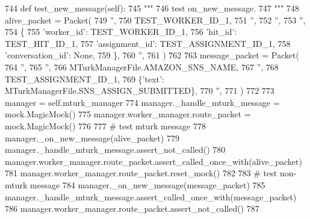 \begin{DoxyCode}
744     \textcolor{keyword}{def }test\_new\_message(self):
745         \textcolor{stringliteral}{"""}
746 \textcolor{stringliteral}{        test on\_new\_message.}
747 \textcolor{stringliteral}{        """}
748         alive\_packet = Packet(
749             \textcolor{stringliteral}{''},
750             TEST\_WORKER\_ID\_1,
751             \textcolor{stringliteral}{''},
752             \textcolor{stringliteral}{''},
753             \textcolor{stringliteral}{''},
754             \{
755                 \textcolor{stringliteral}{'worker\_id'}: TEST\_WORKER\_ID\_1,
756                 \textcolor{stringliteral}{'hit\_id'}: TEST\_HIT\_ID\_1,
757                 \textcolor{stringliteral}{'assignment\_id'}: TEST\_ASSIGNMENT\_ID\_1,
758                 \textcolor{stringliteral}{'conversation\_id'}: \textcolor{keywordtype}{None},
759             \},
760             \textcolor{stringliteral}{''},
761         )
762 
763         message\_packet = Packet(
764             \textcolor{stringliteral}{''},
765             \textcolor{stringliteral}{''},
766             MTurkManagerFile.AMAZON\_SNS\_NAME,
767             \textcolor{stringliteral}{''},
768             TEST\_ASSIGNMENT\_ID\_1,
769             \{\textcolor{stringliteral}{'text'}: MTurkManagerFile.SNS\_ASSIGN\_SUBMITTED\},
770             \textcolor{stringliteral}{''},
771         )
772 
773         manager = self.mturk\_manager
774         manager.\_handle\_mturk\_message = mock.MagicMock()
775         manager.worker\_manager.route\_packet = mock.MagicMock()
776 
777         \textcolor{comment}{# test mturk message}
778         manager.\_on\_new\_message(alive\_packet)
779         manager.\_handle\_mturk\_message.assert\_not\_called()
780         manager.worker\_manager.route\_packet.assert\_called\_once\_with(alive\_packet)
781         manager.worker\_manager.route\_packet.reset\_mock()
782 
783         \textcolor{comment}{# test non-mturk message}
784         manager.\_on\_new\_message(message\_packet)
785         manager.\_handle\_mturk\_message.assert\_called\_once\_with(message\_packet)
786         manager.worker\_manager.route\_packet.assert\_not\_called()
787 
\end{DoxyCode}
\mbox{\label{classparlai_1_1mturk_1_1core_1_1test_1_1test__mturk__manager_1_1TestMTurkManagerUnitFunctions_ab68de0fee2d4992a86b48994f0fa850c}} 
